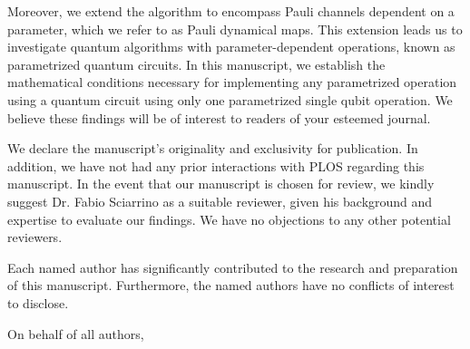 \documentclass[12pt, addrfooterall, english]{if_letter_2013}
\begin{document}
\begin{letter}
Moreover, we extend the algorithm to encompass Pauli channels dependent on a
parameter, which we refer to as Pauli dynamical maps. This extension leads us
to investigate quantum algorithms with parameter-dependent operations, known as
parametrized quantum circuits.  In this manuscript, we establish the
mathematical conditions necessary for implementing any parametrized operation
using a quantum circuit using only one parametrized single qubit operation. We
believe these findings will be of interest to readers of your esteemed journal.

We declare the manuscript’s originality and exclusivity for publication. In
addition, we have not had any prior interactions with PLOS regarding this
manuscript. In the event that our manuscript is chosen for review, we kindly
suggest Dr. Fabio Sciarrino as a suitable reviewer, given his background and
expertise to evaluate our findings. We have no objections to any other
potential reviewers.

Each named author has significantly contributed to the research and preparation
of this manuscript. Furthermore, the named authors have no conflicts of
interest to disclose.



\closing{On behalf of all authors,}

\end{letter}
\end{document}
